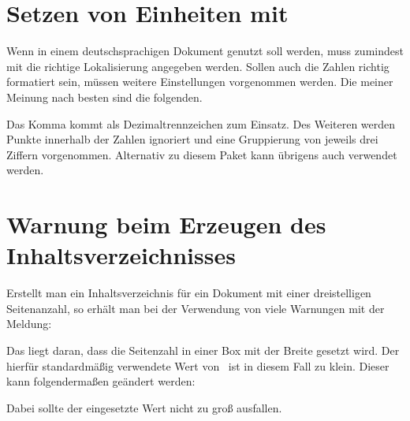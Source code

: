 \section{Setzen von Einheiten mit }
\label{sec:tips:siunitx}
Wenn  in einem deutschsprachigen Dokument genutzt soll
werden, muss zumindest mit  die 
richtige Lokalisierung angegeben werden. Sollen auch die Zahlen richtig 
formatiert sein, müssen weitere Einstellungen vorgenommen werden. Die meiner 
Meinung nach besten sind die folgenden.
%
\begin{quoting}
\begin{Code}
\end{Code}
\end{quoting}
%
Das Komma kommt als Dezimaltrennzeichen zum Einsatz. Des Weiteren werden Punkte 
innerhalb der Zahlen ignoriert und eine Gruppierung von jeweils drei Ziffern 
vorgenommen. Alternativ zu diesem Paket kann übrigens auch  
verwendet werden.



\section{Warnung beim Erzeugen des Inhaltsverzeichnisses}
%
%
%
Erstellt man ein Inhaltsverzeichnis für ein Dokument mit einer dreistelligen 
Seitenanzahl, so erhält man bei der Verwendung von  
viele Warnungen mit der Meldung:
%
\begin{quoting}
\end{quoting}
%
Das liegt daran, dass die Seitenzahl in einer Box mit der Breite 
 gesetzt wird. Der hierfür standardmäßig verwendete Wert 
von~\PValue{1.55em} ist in diesem Fall zu klein. Dieser kann folgendermaßen 
geändert werden:
%
\begin{quoting}
\begin{Code}
\makeatletter
\renewcommand*\@pnumwidth{1.7em}
\makeatother
\end{Code}
\end{quoting}
%
Dabei sollte der eingesetzte Wert nicht zu groß ausfallen.




